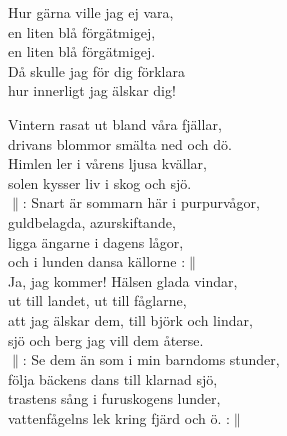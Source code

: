 \documentclass[a6paper, 10pt, twoside]{article}
\begin{document}
\noindent
\begin{center}
\small{}
\end{center}
\begin{lyrics}
Hur gärna ville jag ej vara,\\
en liten blå förgätmigej,\\
en liten blå förgätmigej.\\
Då skulle jag för dig förklara\\
hur innerligt jag älskar dig!
\end{lyrics}
\vspace{30pt}
\begin{center}
\end{center}
\begin{lyrics}
Vintern rasat ut bland våra fjällar,\\
drivans blommor smälta ned och dö.\\
Himlen ler i vårens ljusa kvällar,\\
solen kysser liv i skog och sjö.
\vspace{5pt}\\
$\|$: Snart är sommarn här i purpurvågor,\\
guldbelagda, azurskiftande,\\
ligga ängarne i dagens lågor,\\
och i lunden dansa källorne :$\|$
\vspace{5pt}\\
Ja, jag kommer! Hälsen glada vindar,\\
ut till landet, ut till fåglarne,\\
att jag älskar dem, till björk och lindar,\\
sjö och berg jag vill dem återse.
\vspace{5pt}\\
$\|$: Se dem än som i min barndoms stunder,\\
följa bäckens dans till klarnad sjö,\\
trastens sång i furuskogens lunder,\\
vattenfågelns lek kring fjärd och ö. :$\|$
\end{lyrics}
\end{document}
